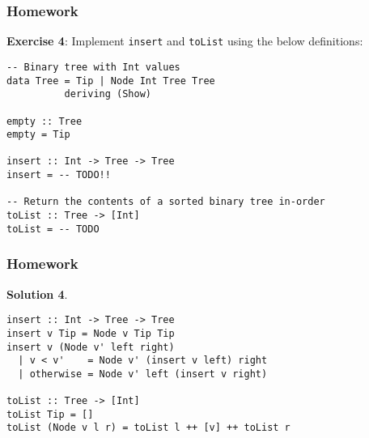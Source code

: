 \documentclass{beamer}
\begin{document}
\begin{frame}[fragile]
\frametitle{Homework}

\textbf{Exercise 4}: Implement \verb+insert+ and \verb+toList+ using the below definitions:

{\small
\begin{verbatim}
-- Binary tree with Int values
data Tree = Tip | Node Int Tree Tree
          deriving (Show)

empty :: Tree
empty = Tip

insert :: Int -> Tree -> Tree
insert = -- TODO!!

-- Return the contents of a sorted binary tree in-order
toList :: Tree -> [Int]
toList = -- TODO
\end{verbatim}
}
\end{frame}

\begin{frame}[fragile]
\frametitle{Homework}

\textbf{Solution 4}.

\bigskip

\begin{verbatim}
insert :: Int -> Tree -> Tree
insert v Tip = Node v Tip Tip
insert v (Node v' left right)
  | v < v'    = Node v' (insert v left) right
  | otherwise = Node v' left (insert v right)

toList :: Tree -> [Int]
toList Tip = []
toList (Node v l r) = toList l ++ [v] ++ toList r
\end{verbatim}

\end{frame}
\end{document}
